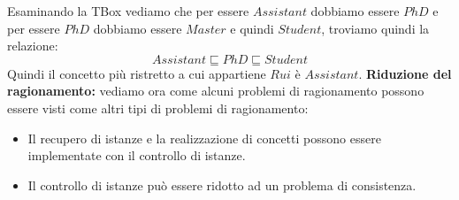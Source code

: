 \documentclass[../main.tex]{subfiles}
\begin{document}
   Esaminando la TBox vediamo che per essere $Assistant$ dobbiamo essere $PhD$ e per essere $PhD$ dobbiamo essere $Master$ e quindi $Student$, troviamo quindi la relazione:
   \begin{equation*}
      Assistant \sqsubseteq PhD \sqsubseteq Student
   \end{equation*}
   Quindi il concetto più ristretto a cui appartiene $Rui$ è $Assistant$.
   \spazio
   \textbf{Riduzione del ragionamento:} vediamo ora come alcuni problemi di ragionamento possono essere visti come altri tipi di problemi di ragionamento:
   \begin{itemize}
      \item Il recupero di istanze e la realizzazione di concetti possono essere implementate con il controllo di istanze.
      \item Il controllo di istanze può essere ridotto ad un problema di consistenza.
   \end{itemize}
\end{document}
